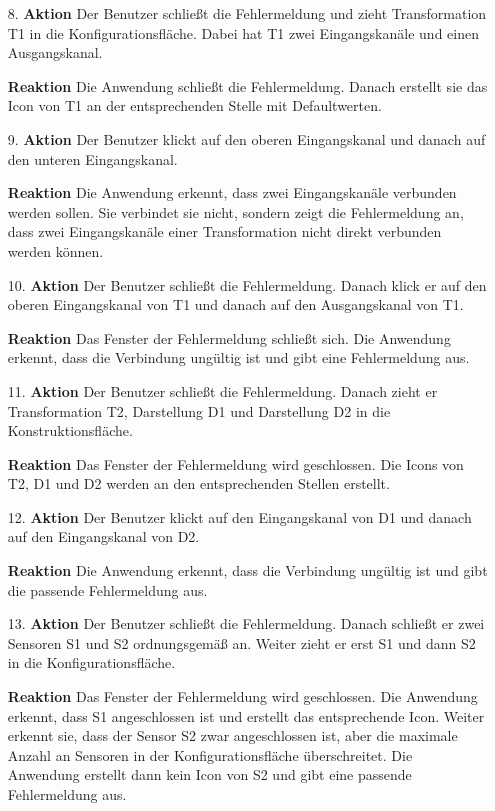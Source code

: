 \documentclass[parskip=full]{scrartcl}
\begin{document}
\begin{itemize}
\begin{itemize}
\item [8.]\textbf{Aktion} Der Benutzer schließt die Fehlermeldung und zieht Transformation T1 in die Konfigurationsfläche. Dabei hat T1 zwei Eingangskanäle und einen Ausgangskanal.
\item []\textbf{Reaktion} Die Anwendung schließt die Fehlermeldung. Danach erstellt sie das Icon von T1 an der entsprechenden Stelle mit Defaultwerten.
\item [9.]\textbf{Aktion} Der Benutzer klickt auf den oberen Eingangskanal und danach auf den unteren Eingangskanal.
\item []\textbf{Reaktion} Die Anwendung erkennt, dass zwei Eingangskanäle verbunden werden sollen. Sie verbindet sie nicht, sondern zeigt die Fehlermeldung an, dass zwei Eingangskanäle einer Transformation nicht direkt verbunden werden können.
\item [10.]\textbf{Aktion} Der Benutzer schließt die Fehlermeldung. Danach klick er auf den oberen Eingangskanal von T1 und danach auf den Ausgangskanal von T1.
\item []\textbf{Reaktion} Das Fenster der Fehlermeldung schließt sich. Die Anwendung erkennt, dass die Verbindung ungültig ist und gibt eine Fehlermeldung aus.
\item [11.]\textbf{Aktion} Der Benutzer schließt die Fehlermeldung. Danach zieht er Transformation T2, Darstellung D1 und Darstellung D2 in die Konstruktionsfläche.
\item []\textbf{Reaktion} Das Fenster der Fehlermeldung wird geschlossen. Die Icons von T2, D1 und D2 werden an den entsprechenden Stellen erstellt.
\item [12.]\textbf{Aktion} Der Benutzer klickt auf den Eingangskanal von D1 und danach auf den Eingangskanal von D2. 
\item []\textbf{Reaktion} Die Anwendung erkennt, dass die Verbindung ungültig ist und gibt die passende Fehlermeldung aus.
\item [13.]\textbf{Aktion} Der Benutzer schließt die Fehlermeldung. Danach schließt er zwei Sensoren S1 und S2 ordnungsgemäß an. Weiter zieht er erst S1 und dann S2 in die Konfigurationsfläche. 
\item []\textbf{Reaktion} Das Fenster der Fehlermeldung wird geschlossen. Die Anwendung erkennt, dass S1 angeschlossen ist und erstellt das entsprechende Icon. Weiter erkennt sie, dass der Sensor S2 zwar angeschlossen ist, aber die maximale Anzahl an Sensoren in der Konfigurationsfläche überschreitet. Die Anwendung erstellt dann kein Icon von S2 und gibt eine passende Fehlermeldung aus.

\end{itemize}
\end{itemize}
\end{document}
